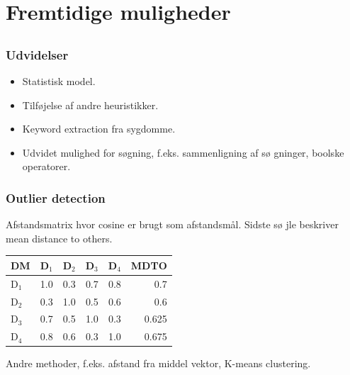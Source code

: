 \documentclass[xcolor=table]{beamer}
\begin{document}
\section{Fremtidige muligheder}

\subsection*{}

\begin{frame}

  \frametitle{Udvidelser}

  \begin{itemize}
    \item Statistisk model.
    \item Tilf\o jelse af andre heuristikker.
    \item Keyword extraction fra sygdomme.
    \item Udvidet mulighed for s\o gning, f.eks. sammenligning af s\o
      gninger, boolske operatorer.
  \end{itemize}

\end{frame}

\begin{frame}

  \frametitle{Outlier detection}

  Afstandsmatrix hvor cosine er brugt som afstandsm\aa l. Sidste s\o
  jle beskriver mean distance to others.

  \begin{center}
    \begin{tabular}{|l|r|r|r|r|r|}
      \hline
      DM    & D$_1$ & D$_2$ & D$_3$ & D$_4$ & MDTO \\
      \hline
      D$_1$ &   1.0 &   0.3 &   0.7 &   0.8 & 0.7 \\
      \hline
      D$_2$ &   0.3 &   1.0 &   0.5 &   0.6 & 0.6 \\
      \hline
      D$_3$ &   0.7 &   0.5 &   1.0 &   0.3 & 0.625 \\
      \hline
      D$_4$ &   0.8 &   0.6 &   0.3 &   1.0 & 0.675 \\
      \hline
    \end{tabular}
  \end{center}


  Andre methoder, f.eks. afstand fra middel vektor, K-means
  clustering.

\end{frame}





\end{document}
